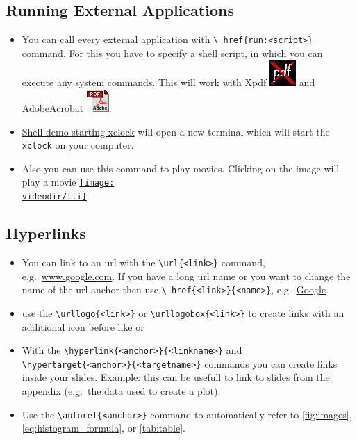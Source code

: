 \documentclass[11pt,a4paper,landscape]{article}
\begin{document}
\NewPage\subsection{Running External Applications}
\begin{itemize}
\item You can call every external application with \texttt{\textbackslash
    href\{run:<script>\}} command.  For this you have to specify a shell
  script, in which you can execute any system commands. This will work with Xpdf
  \href{http://www.foolabs.com/xpdf/}{\includegraphics[scale=0.5]{logos/xpdf}}
  \alert{and} AdobeAcrobat
  \href{http://www.adobe.com/products/acrobat/readstep2.html}{\includegraphics[scale=0.5]{logos/acrobat}}.
\item \href{run:scripts/demo.sh}{Shell demo starting xclock} will open a new
  terminal which will start the \texttt{xclock} on your computer.
\item Also you can use this command to play movies. Clicking on the image will
  play a movie
  \href{run:\videodir/lti.mpg}{\texttt{[image: \\videodir/lti]}}
\end{itemize}
\vfill

\NewPage\subsection{Hyperlinks}
\begin{itemize}
\item You can link to an url with the \texttt{\textbackslash url\{<link>\}}
  command, e.g.\ \url{www.google.com}. If you have a long url name or you want
  to change the name of the url anchor then use \texttt{\textbackslash
    href\{<link>\}\{<name>\}}, e.g.\ \href{http://www.google.com}{Google}.
\item use the \texttt{\textbackslash urllogo\{<link>\}} or
  \texttt{\textbackslash urllogobox\{<link>\}} to create links with an
  additional icon before like  or
\item With the \texttt{\textbackslash hyperlink\{<anchor>\}\{<linkname>\}} and \\
  \texttt{\textbackslash hypertarget\{<anchor>\}\{<targetname>\}} commands you
  can create links inside your slides.  Example: this can be usefull to
  \hyperlink{anchorname}{link to slides from the appendix} (e.g.\ the data used
  to create a plot).
\item Use the \texttt{\textbackslash autoref\{<anchor>\}} command to
  automatically refer to \autoref{fig:images}, \autoref{eq:histogram_formula},
  or \autoref{tab:table}.
\end{itemize}
\end{document}
